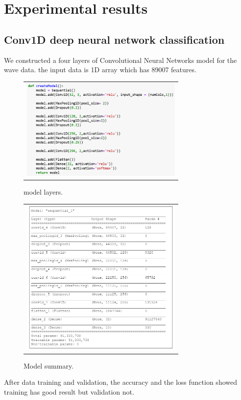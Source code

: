 \documentclass{article}
\begin{document}
\newpage
\section{Experimental results}

\subsection{Conv1D deep neural network classification}
We constructed a four layers of Convolutional Neural Networks model for the wave data. the input data is 1D array which has 89007 features.
\begin{figure}[!htb]
    \begin{tabular}{c}
        \includegraphics[width=8cm]{pic/CNN_Create.png}\\
    \end{tabular}
	\caption{model layers.\label{figure5}}
\end{figure}
\begin{figure}[!htb]
    \begin{tabular}{c}
        \includegraphics[width=8cm]{pic/CNN_Sum.png}\\
    \end{tabular}
	\caption{Model summary.\label{figure6}}
\end{figure}
\newpage
After data training and validation, the accuracy and the loss function showed training has good result but validation not.
\end{document}
